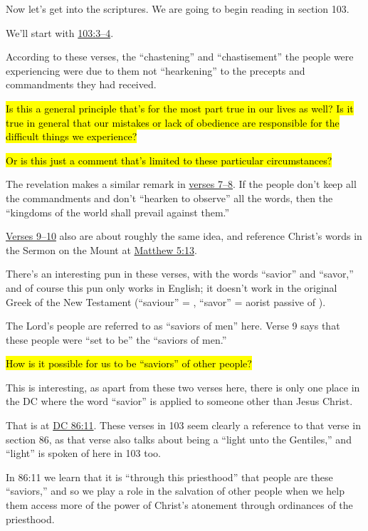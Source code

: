 \begin{compactitem}
			\item Now let's get into the scriptures. We are going to begin reading in section 103.
				\begin{compactitem}
					\item We'll start with \hyperref[DC103-3]{103:3--4}.
						\begin{compactitem}
							\item According to these verses, the ``chastening'' and ``chastisement'' the people were experiencing were due to them not ``hearkening'' to the precepts and commandments they had received.
							\item \hl{Is this a general principle that's for the most part true in our lives as well? Is it true in general that our mistakes or lack of obedience are responsible for the difficult things we experience?}
							\item \hl{Or is this just a comment that's limited to these particular circumstances?}
						\end{compactitem}
					\item The revelation makes a similar remark in \hyperref[DC103-7]{verses 7--8}. If the people don't keep all the commandments and don't ``hearken to observe'' all the words, then the ``kingdoms of the world shall prevail against them.''
					\item \hyperref[DC103-9]{Verses 9--10} also are about roughly the same idea, and reference Christ's words in the Sermon on the Mount at \hyperref[MATTHEW-5-13]{Matthew 5:13}. 
						\begin{compactitem}
							\item There's an interesting pun in these verses, with the words ``savior'' and ``savor,'' and of course this pun only works in English; it doesn't work in the original Greek of the New Testament (``saviour'' = , ``savor'' = aorist passive of ).
							\item The Lord's people are referred to as ``saviors of men'' here. Verse 9 says that these people were ``set to be'' the ``saviors of men.''
							\item \hl{How is it possible for us to be ``saviors'' of other people?}
							\item This is interesting, as apart from these two verses here, there is only one place in the DC where the word ``savior'' is applied to someone other than Jesus Christ.
							\item That is at \hyperref[DC86-11]{DC 86:11}. These verses in 103 seem clearly a reference to that verse in section 86, as that verse also talks about being a ``light unto the Gentiles,'' and ``light'' is spoken of here in 103 too.
						\item In 86:11 we learn that it is ``through this priesthood'' that people are these ``saviors,'' and so we play a role in the salvation of other people when we help them access more of the power of Christ's atonement through ordinances of the priesthood.
						\end{compactitem}
				\end{compactitem}
				

\end{compactitem}
